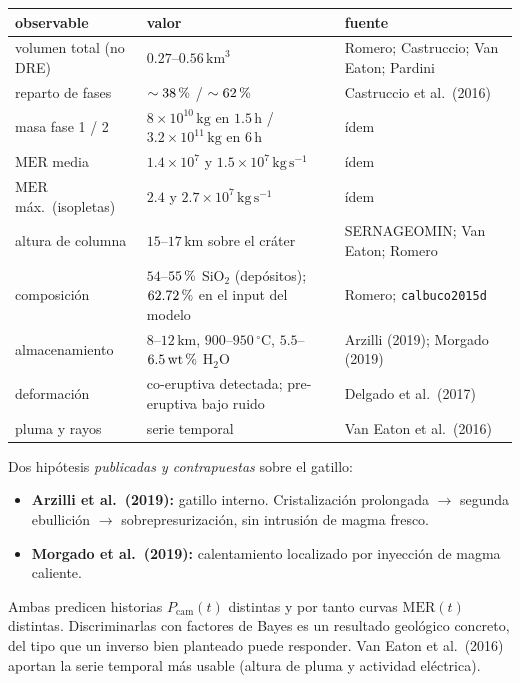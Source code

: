 \documentclass[11pt,a4paper]{article}
\theoremstyle{plain}
\theoremstyle{definition}
\theoremstyle{remark}
\newcommand{\pc}{\ifmmode\text{\,\%}\else\,\%\fi}
\newcommand{\MER}{\mathrm{MER}}
\begin{document}
\begin{center}
\footnotesize
\begin{tabular}{@{}p{}p{}p{}@{}}
\toprule
observable & valor & fuente \\
\midrule
volumen total (no DRE) & $0.27$--$0.56\,\mathrm{km}^3$
  & Romero; Castruccio; Van Eaton; Pardini \\
reparto de fases & $\sim 38\pc$ / $\sim 62\pc$
  & Castruccio et al.\ (2016) \\
masa fase 1 / 2 & $8\times10^{10}\,\mathrm{kg}$ en $1.5\,\mathrm{h}$ /
  $3.2\times10^{11}\,\mathrm{kg}$ en $6\,\mathrm{h}$
  & ídem \\
$\MER$ media & $1.4\times10^7$ y $1.5\times10^7\,\mathrm{kg\,s^{-1}}$
  & ídem \\
$\MER$ máx.\ (isopletas) & $2.4$ y $2.7\times10^7\,\mathrm{kg\,s^{-1}}$
  & ídem \\
altura de columna & $15$--$17\,\mathrm{km}$ sobre el cráter
  & SERNAGEOMIN; Van Eaton; Romero \\
composición & $54$--$55\pc$ SiO$_2$ (depósitos);
  $62.72\pc$ en el input del modelo
  & Romero; \texttt{calbuco2015d} \\
almacenamiento & $8$--$12\,\mathrm{km}$, $900$--$950\,^{\circ}\mathrm{C}$,
  $5.5$--$6.5\,\mathrm{wt\pc}$ H$_2$O
  & Arzilli (2019); Morgado (2019) \\
deformación & co-eruptiva detectada; pre-eruptiva bajo ruido
  & Delgado et al.\ (2017) \\
pluma y rayos & serie temporal
  & Van Eaton et al.\ (2016) \\
\bottomrule
\end{tabular}
\end{center}

Dos hipótesis \emph{publicadas y contrapuestas} sobre el gatillo:

\begin{itemize}
\item \textbf{Arzilli et al.\ (2019):} gatillo interno. Cristalización
  prolongada $\to$ segunda ebullición $\to$ sobrepresurización, sin
  intrusión de magma fresco.
\item \textbf{Morgado et al.\ (2019):} calentamiento localizado por
  inyección de magma caliente.
\end{itemize}

Ambas predicen historias $P_{\mathrm{cam}}(t)$ distintas y por tanto
curvas $\MER(t)$ distintas. Discriminarlas con factores de Bayes es
un resultado geológico concreto, del tipo que un inverso bien
planteado puede responder. Van Eaton et al.\ (2016) aportan la serie
temporal más usable (altura de pluma y actividad eléctrica).
\end{document}
